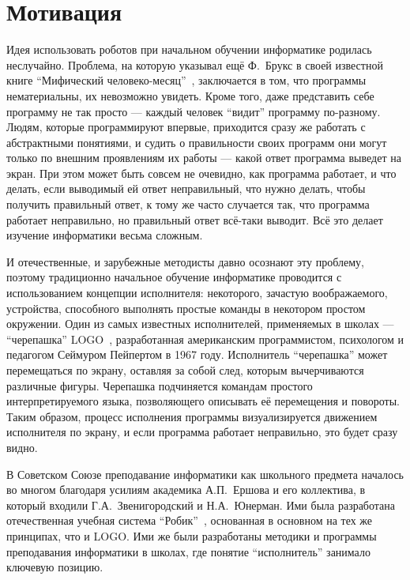 \documentclass[a4paper]{article}
\begin{document}
\section{Мотивация}
Идея использовать роботов при начальном обучении информатике родилась неслучайно. Проблема, на которую указывал ещё Ф.~Брукс в своей известной книге ``Мифический человеко-месяц''~\cite{mythicalManMonth}, заключается в том, что программы нематериальны, их невозможно увидеть. Кроме того, даже представить себе программу не так просто --- каждый человек ``видит'' программу по-разному. Людям, которые программируют впервые, приходится сразу же работать с абстрактными понятиями, и судить о правильности своих программ они могут только по внешним проявлениям их работы --- какой ответ программа выведет на экран. При этом может быть совсем не очевидно, как программа работает, и что делать, если выводимый ей ответ неправильный, что нужно делать, чтобы получить правильный ответ, к тому же часто случается так, что программа работает неправильно, но правильный ответ всё-таки выводит. Всё это делает изучение информатики весьма сложным.

И отечественные, и зарубежные методисты давно осознают эту проблему, поэтому традиционно начальное обучение информатике проводится с использованием концепции исполнителя: некоторого, зачастую воображаемого, устройства, способного выполнять простые команды в некотором простом окружении. Один из самых известных исполнителей, применяемых в школах --- ``черепашка'' LOGO~\cite{logo}, разработанная американским программистом, психологом и педагогом Сеймуром Пейпертом в 1967 году. Исполнитель ``черепашка'' может перемещаться по экрану, оставляя за собой след, которым вычерчиваются различные фигуры. Черепашка подчиняется командам простого интерпретируемого языка, позволяющего описывать её перемещения и повороты. Таким образом, процесс исполнения программы визуализируется движением исполнителя по экрану, и если программа работает неправильно, это будет сразу видно. 

В Советском Союзе преподавание информатики как школьного предмета началось во многом благодаря усилиям академика А.П.~Ершова и его коллектива, в который входили Г.А.~Звенигородский и Н.А.~Юнерман. Ими была разработана отечественная учебная система ``Робик''~\cite{robik}, основанная в основном на тех же принципах, что и LOGO. Ими же были разработаны методики и программы преподавания информатики в школах, где понятие ``исполнитель'' занимало ключевую позицию.
\end{document}
